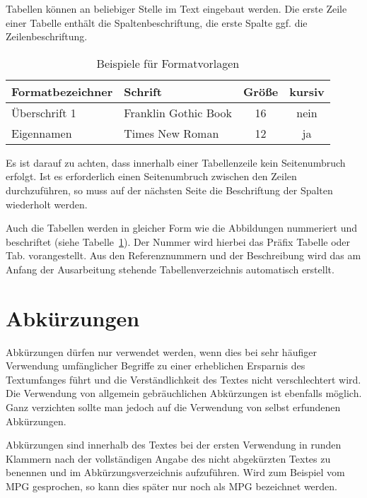 Tabellen können an beliebiger Stelle im Text eingebaut werden. Die erste Zeile einer Tabelle enthält die Spaltenbeschriftung, die erste Spalte ggf. die Zeilenbeschriftung.

\begin{table}[h]
	\centering
	\caption{Beispiele für Formatvorlagen}
	\label{tab:formatvorlagen}
	\begin{tabular}{|l|l|c|c|}
		\hline
		\textbf{Formatbezeichner} & \textbf{Schrift}     & \textbf{Größe} & \textbf{kursiv} \\
		\hline
		Überschrift 1             & Franklin Gothic Book & 16             & nein            \\
		Eigennamen                & Times New Roman      & 12             & ja              \\
		\hline
	\end{tabular}
\end{table}

Es ist darauf zu achten, dass innerhalb einer Tabellenzeile kein Seitenumbruch erfolgt. Ist es erforderlich einen Seitenumbruch zwischen den Zeilen durchzuführen, so muss auf der nächsten Seite die Beschriftung der Spalten wiederholt werden.

Auch die Tabellen werden in gleicher Form wie die Abbildungen nummeriert und beschriftet (siehe Tabelle~\ref{tab:formatvorlagen}). Der Nummer wird hierbei das Präfix Tabelle oder Tab. vorangestellt. Aus den Referenznummern und der Beschreibung wird das am Anfang der Ausarbeitung stehende Tabellenverzeichnis automatisch erstellt.

\section{Abkürzungen}
\label{sec:abkuerzungen}

Abkürzungen dürfen nur verwendet werden, wenn dies bei sehr häufiger Verwendung umfänglicher Begriffe zu einer erheblichen Ersparnis des Textumfanges führt und die Verständlichkeit des Textes nicht verschlechtert wird. Die Verwendung von allgemein gebräuchlichen Abkürzungen ist ebenfalls möglich. Ganz verzichten sollte man jedoch auf die Verwendung von selbst erfundenen Abkürzungen.

Abkürzungen sind innerhalb des Textes bei der ersten Verwendung in runden Klammern nach der vollständigen Angabe des nicht abgekürzten Textes zu benennen und im Abkürzungsverzeichnis aufzuführen. Wird zum Beispiel vom \gls{MPG} gesprochen, so kann dies später nur noch als \gls{MPG} bezeichnet werden.

